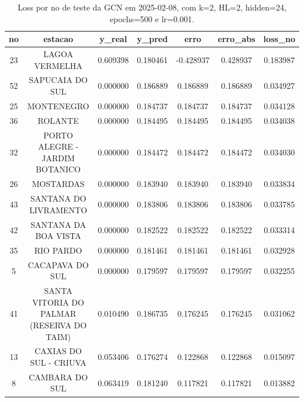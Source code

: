 \begin{table}[h]
\centering
\caption{Loss por no de teste da GCN em 2025-02-08, com k=2, HL=2, hidden=24, epochs=500 e lr=0.001.}
\label{tab:gcn_loss_k2_hl2_h24_e500_d20250208}
\begin{tabular}{ccccccc}
\toprule
no & estacao & y\_real & y\_pred & erro & erro\_abs & loss\_no \\
\midrule
23 & LAGOA VERMELHA & 0.609398 & 0.180461 & -0.428937 & 0.428937 & 0.183987 \\
52 & SAPUCAIA DO SUL & 0.000000 & 0.186889 & 0.186889 & 0.186889 & 0.034927 \\
25 & MONTENEGRO & 0.000000 & 0.184737 & 0.184737 & 0.184737 & 0.034128 \\
36 & ROLANTE & 0.000000 & 0.184495 & 0.184495 & 0.184495 & 0.034038 \\
32 & PORTO ALEGRE - JARDIM BOTANICO & 0.000000 & 0.184472 & 0.184472 & 0.184472 & 0.034030 \\
26 & MOSTARDAS & 0.000000 & 0.183940 & 0.183940 & 0.183940 & 0.033834 \\
43 & SANTANA DO LIVRAMENTO & 0.000000 & 0.183806 & 0.183806 & 0.183806 & 0.033785 \\
42 & SANTANA DA BOA VISTA & 0.000000 & 0.182522 & 0.182522 & 0.182522 & 0.033314 \\
35 & RIO PARDO & 0.000000 & 0.181461 & 0.181461 & 0.181461 & 0.032928 \\
5 & CACAPAVA DO SUL & 0.000000 & 0.179597 & 0.179597 & 0.179597 & 0.032255 \\
41 & SANTA VITORIA DO PALMAR (RESERVA DO TAIM) & 0.010490 & 0.186735 & 0.176245 & 0.176245 & 0.031062 \\
13 & CAXIAS DO SUL - CRIUVA & 0.053406 & 0.176274 & 0.122868 & 0.122868 & 0.015097 \\
8 & CAMBARA DO SUL & 0.063419 & 0.181240 & 0.117821 & 0.117821 & 0.013882 \\
\bottomrule
\end{tabular}
\end{table}
